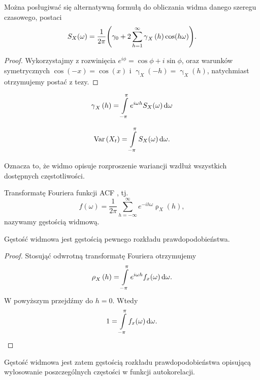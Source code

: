 \documentclass[10pt,a4paper]{book}
\newcommand{\tsAutoCovariance}[3][\gamma]{\operatorname{#1}_{#2} \left({#3}\right)}
\newcommand{\tsAutoCorellation}[3][\rho]{\operatorname{#1}_{#2} \left({#3}\right)}
\begin{document}
\begin{corollary}
Można posługiwać się alternatywną formułą do obliczania widma danego szeregu czasowego, postaci
$$
S_X(\omega) = \frac{1}{2\pi} \bracket{\gamma_0 + 2 \sum_{h=1}^{\infty} \tsAutoCovariance{X}{h} \cos(h\omega)}.
$$
\end{corollary}

\begin{proof}
Wykorzystajmy z rozwinięcia $e^{i\phi} = \cos \phi + i \sin \phi$, oraz warunków symetrycznych $\cos(-x) = \cos(x)$ i $\tsAutoCovariance{X}{-h} = \tsAutoCovariance{X}{h}$, natychmiast otrzymujemy postać z tezy.
\end{proof}

\begin{corollary}
$$
\tsAutoCovariance{X}{h} = \int_{-\pi}^{\pi} e^{i\omega h} S_X(\omega) \dt[\omega] 
$$
\end{corollary}

\begin{corollary}
$$
\Variance{X_t} = \int_{-\pi }^{\pi} S_X(\omega) \dt[\omega].
$$
\end{corollary}

Oznacza to, że widmo opisuje rozproszenie wariancji wzdłuż wszystkich dostępnych częstotliwości.

\begin{definition}
Transformatę Fouriera funkcji ACF , tj. 
$$
f(\omega) = \frac{1}{2\pi} \sum_{h=-\infty}^{\infty} e^{-i h \omega} \tsAutoCorellation{X}{h},
$$
nazywamy gęstością widmową.
\end{definition}

\begin{theorem}
Gęstość widmowa jest gęstością pewnego rozkładu prawdopodobieństwa.
\end{theorem}

\begin{proof}
Stosująć odwrotną transformatę Fouriera otrzymujemy
$$
\tsAutoCorellation{X}{h}= \int_{-\pi}^{\pi} e^{i \omega h} f_x(\omega) \dt[\omega].
$$
W powyższym przejdźmy do $h=0$. Wtedy
$$
1= \int_{-\pi}^{\pi} f_x(\omega) \dt[\omega].
$$
\end{proof}

Gęstość widmowa jest zatem gęstością rozkładu prawdopodobieństwa opisującą wylosowanie poszczególnych częstości w funkcji autokorelacji. 
\end{document}
